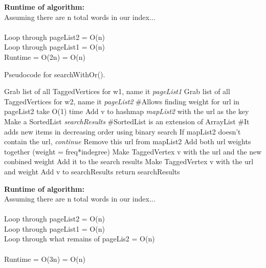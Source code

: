 \documentclass[12pt]{article}
\begin{document}
\noindent \textbf{Runtime of algorithm:} \\
Assuming there are n total words in our index...\\\\
Loop through pageList2 = O(n)\\
Loop through pageList1 = O(n)\\
Runtime = O(2n) = O(n)



\pagebreak



\begin{algorithm}[H]
\caption{Pseudocode for searchWithOr().}
\begin{algorithmic}
\State Grab list of all TaggedVertices for w1, name it \textit{pageList1}
\State Grab list of all TaggedVertices for w2, name it \textit{pageList2}
\State 
\State \#Allows finding weight for url in pageList2 take O(1) time
\State Add v to hashmap \textit{mapList2} with the url as the key
\EndFor
\State Make a SortedList \textit{searchResults}
\State \#SortedList is an extension of ArrayList
\State \#It adds new items in decreasing order using binary search
\State 
{}
\State If mapList2 doesn't contain the url, \textit{continue}
\State 
\State *Remove this url from mapList2
\State 
\State Add both url weights together (weight = freq*indegree)
\State 
\State Make TaggedVertex v with the url and the new conbined weight
\State Add it to the search results
\EndFor
{}
\State Make TaggedVertex v with the url and weight
\State Add v to searchResults
\EndFor
\State return searchResults

\end{algorithmic}
\end{algorithm}

\noindent \textbf{Runtime of algorithm:} \\
Assuming there are n total words in our index...\\\\
Loop through pageList2 = O(n)\\
Loop through pageList1 = O(n)\\
Loop through what remains of pageLis2 = O(n)\\\\
Runtime = O(3n) = O(n)


\pagebreak 
\end{document}
